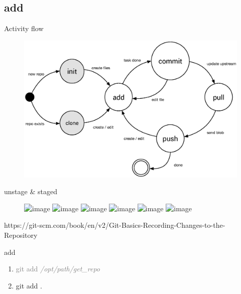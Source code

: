 \documentclass{beamer}
\begin{document}
\subsection[add]{add}
\begin{frame}{Activity flow}
    \begin{figure}
        \center
        \includegraphics[width=.9\textwidth]{git-command-flow-1}
        \label{fig:git-command-flow-1}
    \end{figure}
\end{frame}

\begin{frame}{unstage \& staged}
    \begin{figure}
        \center
        \includegraphics<1>[width=.8\textwidth]{project-changed-0}
        \includegraphics<2>[width=.8\textwidth]{project-changed-1}
        \includegraphics<3>[width=.8\textwidth]{project-changed-2}
        \includegraphics<4>[width=.8\textwidth]{project-changed-3-2}
        \includegraphics<5>[width=.8\textwidth]{project-changed-3-1}
        \includegraphics<6>[width=.8\textwidth]{project-changed-4}
        \label{fig:project-changed}
    \end{figure}
    \small{https://git-scm.com/book/en/v2/Git-Basics-Recording-Changes-to-the-Repository}
\end{frame}

\begin{frame}{add}
    \begin{enumerate}[\$]
        \item<1-> \textcolor<2>{gray}{\Large{git add \em{/opt/path/get\_repo}}}
        \item<2> \Large{git add .}
    \end{enumerate}
\end{frame}
\end{document}
